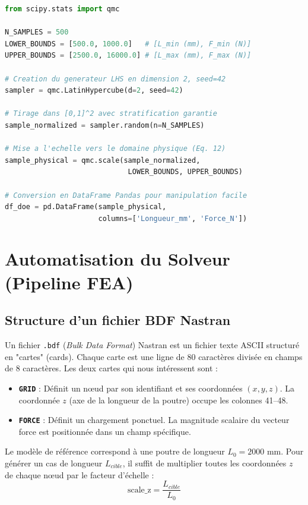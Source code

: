 \documentclass[journal, a4paper, twocolumn]{IEEEtran}
\begin{document}
\begin{lstlisting}[language=Python, caption=Génération du plan LHS avec SciPy]
from scipy.stats import qmc

N_SAMPLES = 500
LOWER_BOUNDS = [500.0, 1000.0]   # [L_min (mm), F_min (N)]
UPPER_BOUNDS = [2500.0, 16000.0] # [L_max (mm), F_max (N)]

# Creation du generateur LHS en dimension 2, seed=42
sampler = qmc.LatinHypercube(d=2, seed=42)

# Tirage dans [0,1]^2 avec stratification garantie
sample_normalized = sampler.random(n=N_SAMPLES)

# Mise a l'echelle vers le domaine physique (Eq. 12)
sample_physical = qmc.scale(sample_normalized,
                             LOWER_BOUNDS, UPPER_BOUNDS)

# Conversion en DataFrame Pandas pour manipulation facile
df_doe = pd.DataFrame(sample_physical,
                      columns=['Longueur_mm', 'Force_N'])
\end{lstlisting}

\section{Automatisation du Solveur (Pipeline FEA)}

\subsection{Structure d'un fichier BDF Nastran}

Un fichier \texttt{.bdf} (\textit{Bulk Data Format}) Nastran est un fichier texte ASCII structuré en "cartes" (cards). Chaque carte est une ligne de 80 caractères divisée en champs de 8 caractères. Les deux cartes qui nous intéressent sont :
\begin{itemize}
    \item \textbf{\texttt{GRID}} : Définit un nœud par son identifiant et ses coordonnées $(x, y, z)$. La coordonnée $z$ (axe de la longueur de la poutre) occupe les colonnes 41--48.
    \item \textbf{\texttt{FORCE}} : Définit un chargement ponctuel. La magnitude scalaire du vecteur force est positionnée dans un champ spécifique.
\end{itemize}

Le modèle de référence correspond à une poutre de longueur $L_0 = 2000$ mm. Pour générer un cas de longueur $L_{cible}$, il suffit de multiplier toutes les coordonnées $z$ de chaque nœud par le facteur d'échelle :
\begin{equation}
    \text{scale\_z} = \frac{L_{cible}}{L_0}
\end{equation}
\end{document}
